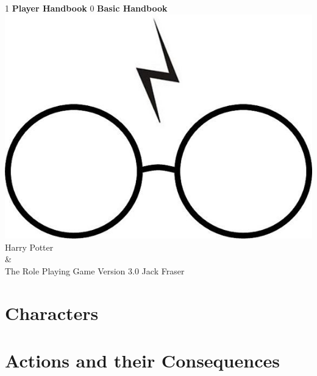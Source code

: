 \documentclass[oneside, twocolumn,9pt,english]{extbook}
\def\coreMode{1}
\newcommand*\cleartoleftpage{%
  \clearpage
  \ifodd\value{page}\hbox{}\clearpage\fi
}
\begin{document}
\begin{titlepage}
    \centering
    \vfill
    \if\coreMode1
    {\bfseries
        {\HP \fontsize{40}{35}\selectfont Player Handbook}
    }    
    \fi
    \if\coreMode0
    {\bfseries
        {\HP \fontsize{40}{35}\selectfont Basic Handbook}
    } 
    \fi
    \vfill
    \includegraphics[scale = 0.7]{../Images/glasses} %
    \vfill
    {\HP \fontsize{30}{24} \selectfont  Harry Potter \\\&\\ The Role Playing Game}
    \normalsize
    \vfill
    {\HP \fontsize{22}{0} \selectfont Version 3.0 \hfill Jack Fraser}
\end{titlepage}

\setcounter{tocdepth}{0}  
\begin{spacing}{0.8}
\footnotesize
\tableofcontents
\normalsize
\end{spacing}


\cleartoleftpage
\part{Characters} \label{C:CharacterCreation}


%



\cleartoleftpage
\part{Actions and their Consequences}
\end{document}
